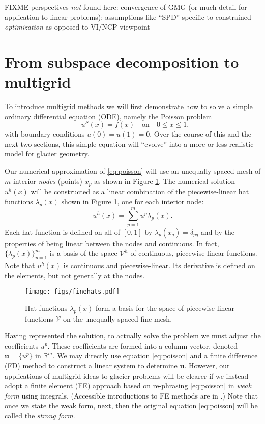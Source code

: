 \documentclass[letterpaper,final,12pt,reqno]{amsart}
\newcommand{\RR}{\mathbb{R}}
\newcommand{\bu}{\mathbf{u}}
\begin{document}
FIXME perspectives \emph{not} found here: convergence of GMG (or much detail for application to linear problems); assumptions like ``SPD'' specific to constrained \emph{optimization} as opposed to VI/NCP viewpoint


\section{From subspace decomposition to multigrid} \label{sec:subspace}

To introduce multigrid methods we will first demonstrate how to solve a simple ordinary differential equation (ODE), namely the Poisson problem
\begin{equation}
- u''(x) = f(x) \quad \text{on} \quad 0 \le x \le 1, \label{eq:poisson}
\end{equation}
with boundary conditions $u(0)=u(1)=0$.  Over the course of this and the next two sections, this simple equation will ``evolve'' into a more-or-less realistic model for glacier geometry.

Our numerical approximation of \eqref{eq:poisson} will use an unequally-spaced mesh of $m$ interior \emph{nodes} (points) $x_p$ as shown in Figure \ref{fig:finehats}.  The numerical solution $u^h(x)$ will be constructed as a linear combination of the piecewise-linear hat functions $\lambda_p(x)$ shown in Figure \ref{fig:finehats}, one for each interior node:
\begin{equation}
u^h(x) = \sum_{p=1}^m u^p \lambda_p(x). \label{eq:trialsolution}
\end{equation}
Each hat function is defined on all of $[0,1]$ by $\lambda_p(x_q) = \delta_{pq}$ and by the properties of being linear between the nodes and continuous.  In fact, $\{\lambda_p(x)\}_{p=1}^m$ is a basis of the space $\mathcal{V}^h$ of continuous, piecewise-linear functions.  Note that $u^h(x)$ is continuous and piecewise-linear.  Its derivative is defined on the elements, but not generally at the nodes.

\begin{figure}
\texttt{[image: figs/finehats.pdf]}
\caption{Hat functions $\lambda_p(x)$ form a basis for the space of piecewise-linear functions $\mathcal{V}$ on the unequally-spaced fine mesh.}
\label{fig:finehats}
\end{figure}

Having represented the solution, to actually solve the problem we must adjust the coefficients $u^p$.  These coefficients are formed into a column vector, denoted $\bu=\{u^p\}$ in $\RR^m$.  We may directly use equation \eqref{eq:poisson} and a finite difference (FD) method \cite{LeVeque2007} to construct a linear system to determine $\bu$.  However, our applications of multigrid ideas to glacier problems will be clearer if we instead adopt a finite element (FE) approach based on re-phrasing \eqref{eq:poisson} in \emph{weak form} using integrals.  (Accessible introductions to FE methods are in \cite{Bueler2021,Elmanetal2014,Johnson2009}.)  Note that once we state the weak form, next, then the original equation \eqref{eq:poisson} will be called the \emph{strong form}.
\end{document}
